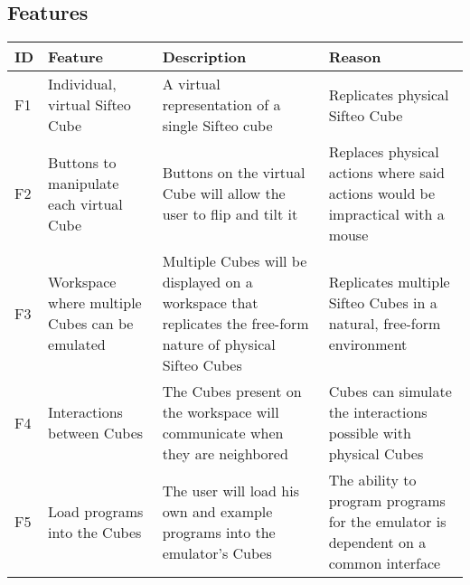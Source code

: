 \documentclass[12pt]{article}
\begin{document}


\appendix
    \begin{landscape}
    \section{Features}
    \begin{table}[h!]
      \begin{tabular}{p{.25in} | p{2.75in} | p{3in} | p{3in}}
        \textbf{ID} &
        \textbf{Feature} &
        \textbf{Description} &
        \textbf{Reason} 
        \\ \hline

        F1 &
        Individual, virtual Sifteo Cube &
        A virtual representation of a single Sifteo cube &
        Replicates physical Sifteo Cube
        \\ \hline

        F2 &
        Buttons to manipulate each virtual Cube &
        Buttons on the virtual Cube will allow the user to flip and tilt it &
        Replaces physical actions where said actions would be impractical with a mouse
        \\ \hline

        F3 &
        Workspace where multiple Cubes can be emulated &
        Multiple Cubes will be displayed on a workspace that replicates the free-form nature of physical Sifteo Cubes\index{Sifteo Cubes} &
        Replicates multiple Sifteo Cubes\index{Sifteo Cubes} in a natural, free-form environment
        \\ \hline

        F4 &
        Interactions between Cubes &
        The Cubes present on the workspace will communicate when they are neighbored &
        Cubes can simulate the interactions possible with physical Cubes
        \\ \hline

        F5 &
        Load programs into the Cubes &
        The user will load his own and example programs into the emulator’s\index{emulator} Cubes &
        The ability to program programs for the emulator\index{emulator} is dependent on a common interface
        \\ \hline


\end{tabular}
\end{table}
\end{landscape}
\end{document}
